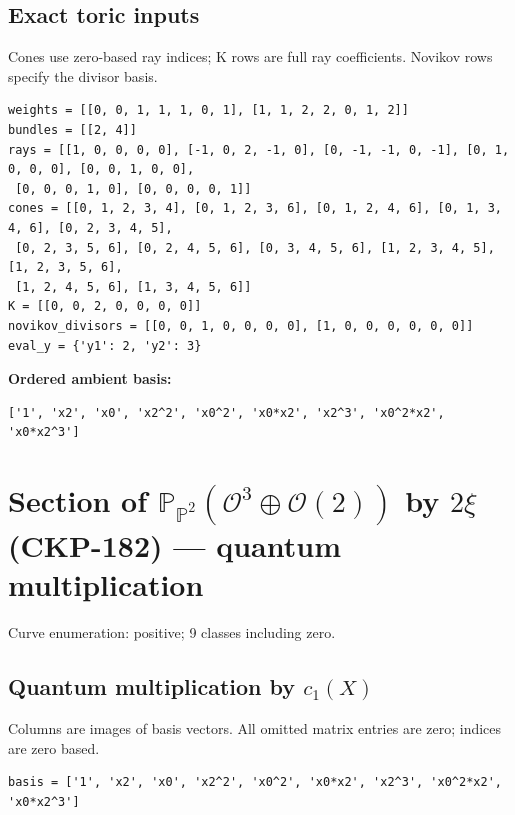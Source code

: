 \documentclass[10pt,a4paper]{article}
\begin{document}
\subsection*{Exact toric inputs}
Cones use zero-based ray indices; K rows are full ray coefficients. Novikov rows specify the divisor basis.

\begin{lstlisting}
weights = [[0, 0, 1, 1, 1, 0, 1], [1, 1, 2, 2, 0, 1, 2]]
bundles = [[2, 4]]
rays = [[1, 0, 0, 0, 0], [-1, 0, 2, -1, 0], [0, -1, -1, 0, -1], [0, 1, 0, 0, 0], [0, 0, 1, 0, 0],
 [0, 0, 0, 1, 0], [0, 0, 0, 0, 1]]
cones = [[0, 1, 2, 3, 4], [0, 1, 2, 3, 6], [0, 1, 2, 4, 6], [0, 1, 3, 4, 6], [0, 2, 3, 4, 5],
 [0, 2, 3, 5, 6], [0, 2, 4, 5, 6], [0, 3, 4, 5, 6], [1, 2, 3, 4, 5], [1, 2, 3, 5, 6],
 [1, 2, 4, 5, 6], [1, 3, 4, 5, 6]]
K = [[0, 0, 2, 0, 0, 0, 0]]
novikov_divisors = [[0, 0, 1, 0, 0, 0, 0], [1, 0, 0, 0, 0, 0, 0]]
eval_y = {'y1': 2, 'y2': 3}
\end{lstlisting}

\textbf{Ordered ambient basis:}
\begin{lstlisting}
['1', 'x2', 'x0', 'x2^2', 'x0^2', 'x0*x2', 'x2^3', 'x0^2*x2', 'x0*x2^3']
\end{lstlisting}

\clearpage\section*{Section of $\mathbb P_{\mathbb P^{2}}(\mathcal O^{3}\oplus \mathcal O(2))$ by $2\xi $ (CKP-182) --- quantum multiplication}

Curve enumeration: positive; 9 classes including zero.
\subsection*{Quantum multiplication by $c_1(X)$}
Columns are images of basis vectors. All omitted matrix entries are zero; indices are zero based.

\begin{lstlisting}
basis = ['1', 'x2', 'x0', 'x2^2', 'x0^2', 'x0*x2', 'x2^3', 'x0^2*x2', 'x0*x2^3']
\end{lstlisting}
\end{document}
